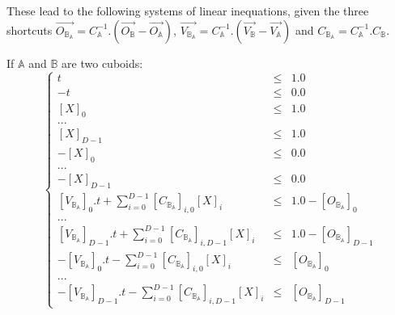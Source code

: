 \documentclass[12pt, a4paper]{article}
\begin{document}
These lead to the following systems of linear inequations, given the three shortcuts $\overrightarrow{O_{\mathbb{B}_\mathbb{A}}}=C_\mathbb{A}^{-1}.(\overrightarrow{O_\mathbb{B}}-\overrightarrow{O_\mathbb{A}})$, $\overrightarrow{V_{\mathbb{B}_\mathbb{A}}}=C_\mathbb{A}^{-1}.(\overrightarrow{V_\mathbb{B}}-\overrightarrow{V_\mathbb{A}})$ and $C_{\mathbb{B}_\mathbb{A}}=C_\mathbb{A}^{-1}.C_{\mathbb{B}}$.

If $\mathbb{A}$ and $\mathbb{B}$ are two cuboids:
\begin{equation}
\left\lbrace
\begin{array}{rcl}
t&\le&1.0\\
-t&\le&0.0\\
\left[X\right]_0&\le&1.0\\
...\\
\left[X\right]_{D-1}&\le&1.0\\
-\left[X\right]_0&\le&0.0\\
...\\
-\left[X\right]_{D-1}&\le&0.0\\
\left[V_{\mathbb{B}_\mathbb{A}}\right]_0.t+\sum_{i=0}^{D-1}\left[C_{\mathbb{B}_\mathbb{A}}\right]_{i,0}\left[X\right]_i&\le&1.0-\left[O_{\mathbb{B}_\mathbb{A}}\right]_0\\
...\\
\left[V_{\mathbb{B}_\mathbb{A}}\right]_{D-1}.t+\sum_{i=0}^{D-1}\left[C_{\mathbb{B}_\mathbb{A}}\right]_{i,D-1}\left[X\right]_i&\le&1.0-\left[O_{\mathbb{B}_\mathbb{A}}\right]_{D-1}\\
-\left[V_{\mathbb{B}_\mathbb{A}}\right]_0.t-\sum_{i=0}^{D-1}\left[C_{\mathbb{B}_\mathbb{A}}\right]_{i,0}\left[X\right]_i&\le&\left[O_{\mathbb{B}_\mathbb{A}}\right]_0\\
...\\
-\left[V_{\mathbb{B}_\mathbb{A}}\right]_{D-1}.t-\sum_{i=0}^{D-1}\left[C_{\mathbb{B}_\mathbb{A}}\right]_{i,D-1}\left[X\right]_i&\le&\left[O_{\mathbb{B}_\mathbb{A}}\right]_{D-1}
\end{array}
\right.
\end{equation}
\end{document}
